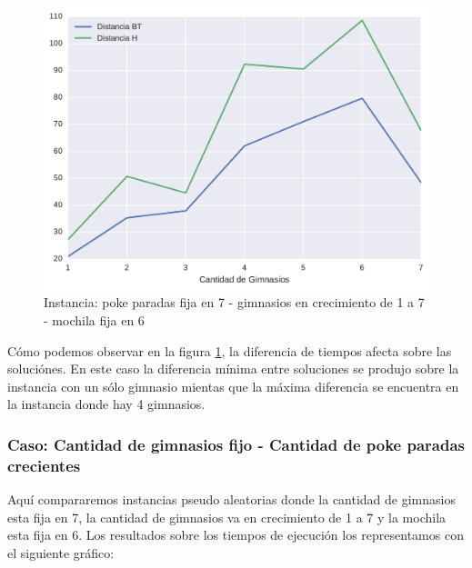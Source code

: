 \begin{figure}[H]
  \begin{center}
    \includegraphics[scale=0.8]{imagenes/ej2test1hvsbttiemposb.pdf}
    \caption{Instancia: poke paradas fija en 7 - gimnasios en crecimiento de 1 a 7 - mochila fija en 6}
    \label{ej2test1b}
  \end{center}
\end{figure}

Cómo podemos observar en la figura \ref{ej2test1b}, la diferencia de tiempos afecta sobre las soluciónes. En este caso la diferencia mínima entre soluciones se produjo sobre la instancia con un sólo gimnasio mientas que la máxima diferencia se encuentra en la instancia donde hay 4 gimnasios.


\subsubsection{Caso: Cantidad de gimnasios fijo - Cantidad de poke paradas crecientes}
Aquí compararemos instancias pseudo aleatorias donde la cantidad de gimnasios esta fija en 7, la cantidad de gimnasios va en crecimiento de 1 a 7 y la mochila esta fija en 6.
Los resultados sobre los tiempos de ejecución los representamos con el siguiente gráfico:

